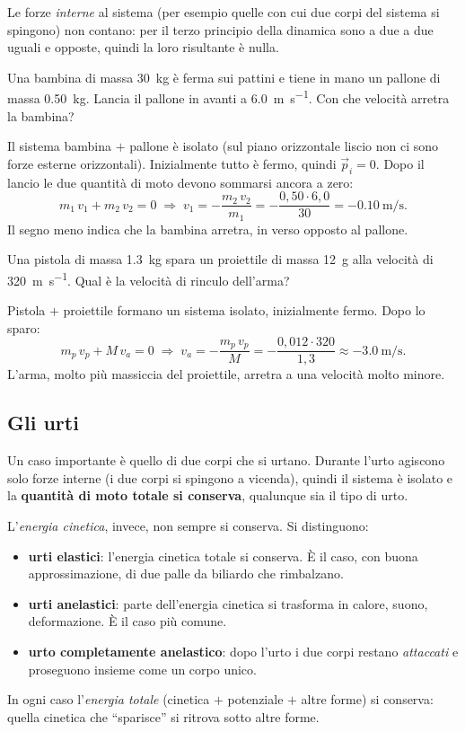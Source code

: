 Le forze \emph{interne} al sistema (per esempio quelle con cui due corpi del sistema si spingono) non contano: per il terzo principio della dinamica sono a due a due uguali e opposte, quindi la loro risultante è nulla.

\begin{testexample}
Una bambina di massa \SI{30}{\kilo\gram} è ferma sui pattini e tiene in mano un pallone di massa \SI{0,50}{\kilo\gram}. Lancia il pallone in avanti a \SI{6,0}{\metre\per\second}. Con che velocità arretra la bambina?

Il sistema bambina $+$ pallone è isolato (sul piano orizzontale liscio non ci sono forze esterne orizzontali). Inizialmente tutto è fermo, quindi $\vec p_i = 0$. Dopo il lancio le due quantità di moto devono sommarsi ancora a zero:
\[ m_1\,v_1 + m_2\,v_2 = 0 \;\Longrightarrow\; v_1 = -\frac{m_2\,v_2}{m_1} = -\frac{0{,}50 \cdot 6{,}0}{30} = \SI{-0,10}{\metre\per\second}. \]
Il segno meno indica che la bambina arretra, in verso opposto al pallone.
\end{testexample}

\begin{testexample}
Una pistola di massa \SI{1,3}{\kilo\gram} spara un proiettile di massa \SI{12}{\gram} alla velocità di \SI{320}{\metre\per\second}. Qual è la velocità di rinculo dell'arma?

Pistola $+$ proiettile formano un sistema isolato, inizialmente fermo. Dopo lo sparo:
\[ m_p\,v_p + M\,v_a = 0 \;\Longrightarrow\; v_a = -\frac{m_p\,v_p}{M} = -\frac{0{,}012 \cdot 320}{1{,}3} \approx \SI{-3,0}{\metre\per\second}. \]
L'arma, molto più massiccia del proiettile, arretra a una velocità molto minore.
\end{testexample}

\subsection{Gli urti}
Un caso importante è quello di due corpi che si urtano. Durante l'urto agiscono solo forze interne (i due corpi si spingono a vicenda), quindi il sistema è isolato e la \textbf{quantità di moto totale si conserva}, qualunque sia il tipo di urto.

L'\emph{energia cinetica}, invece, non sempre si conserva. Si distinguono:
\begin{itemize}
    \item \textbf{urti elastici}: l'energia cinetica totale si conserva. È il caso, con buona approssimazione, di due palle da biliardo che rimbalzano.
    \item \textbf{urti anelastici}: parte dell'energia cinetica si trasforma in calore, suono, deformazione. È il caso più comune.
    \item \textbf{urto completamente anelastico}: dopo l'urto i due corpi restano \emph{attaccati} e proseguono insieme come un corpo unico.
\end{itemize}
In ogni caso l'\emph{energia totale} (cinetica $+$ potenziale $+$ altre forme) si conserva: quella cinetica che ``sparisce'' si ritrova sotto altre forme.

